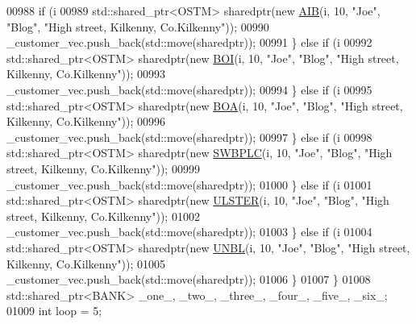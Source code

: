 \begin{DoxyCode}
00988         \textcolor{keywordflow}{if} (i %
00989             std::shared\_ptr<OSTM> sharedptr(\textcolor{keyword}{new} \hyperlink{class_a_i_b}{AIB}(i, 10, \textcolor{stringliteral}{"Joe"}, \textcolor{stringliteral}{"Blog"}, \textcolor{stringliteral}{"High street, Kilkenny,
       Co.Kilkenny"}));
00990             \_customer\_vec.push\_back(std::move(sharedptr));
00991         \} \textcolor{keywordflow}{else} \textcolor{keywordflow}{if} (i %
00992             std::shared\_ptr<OSTM> sharedptr(\textcolor{keyword}{new} \hyperlink{class_b_o_i}{BOI}(i, 10, \textcolor{stringliteral}{"Joe"}, \textcolor{stringliteral}{"Blog"}, \textcolor{stringliteral}{"High street, Kilkenny,
       Co.Kilkenny"}));
00993             \_customer\_vec.push\_back(std::move(sharedptr));
00994         \} \textcolor{keywordflow}{else} \textcolor{keywordflow}{if} (i %
00995             std::shared\_ptr<OSTM> sharedptr(\textcolor{keyword}{new} \hyperlink{class_b_o_a}{BOA}(i, 10, \textcolor{stringliteral}{"Joe"}, \textcolor{stringliteral}{"Blog"}, \textcolor{stringliteral}{"High street, Kilkenny,
       Co.Kilkenny"}));
00996             \_customer\_vec.push\_back(std::move(sharedptr));
00997         \} \textcolor{keywordflow}{else} \textcolor{keywordflow}{if} (i %
00998             std::shared\_ptr<OSTM> sharedptr(\textcolor{keyword}{new} \hyperlink{class_s_w_b_p_l_c}{SWBPLC}(i, 10, \textcolor{stringliteral}{"Joe"}, \textcolor{stringliteral}{"Blog"}, \textcolor{stringliteral}{"High street, Kilkenny,
       Co.Kilkenny"}));
00999             \_customer\_vec.push\_back(std::move(sharedptr));
01000         \} \textcolor{keywordflow}{else} \textcolor{keywordflow}{if} (i %
01001             std::shared\_ptr<OSTM> sharedptr(\textcolor{keyword}{new} \hyperlink{class_u_l_s_t_e_r}{ULSTER}(i, 10, \textcolor{stringliteral}{"Joe"}, \textcolor{stringliteral}{"Blog"}, \textcolor{stringliteral}{"High street, Kilkenny,
       Co.Kilkenny"}));
01002             \_customer\_vec.push\_back(std::move(sharedptr));
01003         \} \textcolor{keywordflow}{else} \textcolor{keywordflow}{if} (i %
01004             std::shared\_ptr<OSTM> sharedptr(\textcolor{keyword}{new} \hyperlink{class_u_n_b_l}{UNBL}(i, 10, \textcolor{stringliteral}{"Joe"}, \textcolor{stringliteral}{"Blog"}, \textcolor{stringliteral}{"High street, Kilkenny,
       Co.Kilkenny"}));
01005             \_customer\_vec.push\_back(std::move(sharedptr));
01006         \}
01007     \}
01008     std::shared\_ptr<BANK> \_one\_, \_two\_, \_three\_, \_four\_, \_five\_, \_six\_;
01009     \textcolor{keywordtype}{int} loop = 5;

\end{DoxyCode}
